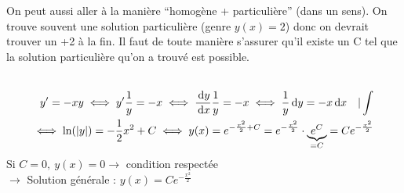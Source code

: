 \documentclass[12pt,a4paper]{article}
\renewcommand{\)}{\right)}
\renewcommand{\(}{\left(}
\begin{document}
On peut aussi aller à la manière \enquote{homogène + particulière} (dans un sens). On trouve souvent une solution particulière (genre $y(x) = 2$) donc on devrait trouver un +2 à la fin. Il faut de toute manière s'assurer qu'il existe un C tel que la solution particulière qu'on a trouvé  est possible.\\
\\
\begin{exemple}
	\begin{align*} 
	y' = -xy \iff y'\frac{1}{y} = -x \iff \frac{\, \mathrm d y}{\, \mathrm d x} \frac{1}{y} = -x \iff \frac{1}{y}\, \mathrm d y = -x \, \mathrm d x \quad |\int\\
	\iff\ln(|y|) = -\frac{1}{2}x^2 + C \iff y(x)=e^{-\frac{x^2}{2} + C} = e^{-\frac{x^2}{2}} \cdot \underbrace{e^C}_{=C} = Ce^{-\frac{x^2}{2}}
	\end{align*}
	Si $C = 0,\ y(x) = 0 \to$ condition respectée\\
	$\to$ Solution générale : $y(x) = Ce^{-\frac{x^2}{2}}$
\end{exemple}
\end{document}
